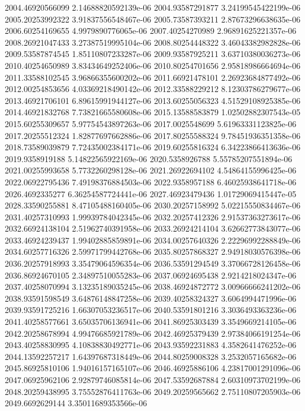 {2004.46920566099 2.14688820592139e-06
2004.93587291877 3.24199545422199e-06
2005.20253992322 3.91837556548467e-06
2005.73587393211 2.87673296638635e-06
2006.60254169655 4.9979890776065e-06
2007.40254270989 2.96891625221357e-06
2008.26921047433 3.27387519995104e-06
2008.80254448322 3.46043382982828e-06
2009.53587874545 1.85110807233287e-06
2009.93587925211 3.63710380036273e-06
2010.40254650989 3.83434649252406e-06
2010.80254701656 2.95818986664694e-06
2011.33588102545 3.96866355600202e-06
2011.66921478101 2.26923684877492e-06
2012.00254853656 4.03369218490142e-06
2012.33588229212 8.12303786279677e-06
2013.46921706101 6.89615991944127e-06
2013.60255056323 4.51529108925385e-06
2014.46921832768 7.73821665580608e-06
2015.13588583879 1.02502882307543e-05
2015.60255309657 5.97754543897263e-06
2017.0025548699 5.61963331123825e-06
2017.20255512324 1.82877697662886e-06
2017.80255588324 9.78451936351358e-06
2018.73589039879 7.72435002384171e-06
2019.60255816324 6.34223866413636e-06
2019.9358919188 5.14822565922169e-06
2020.5358926788 5.55785207551894e-06
2021.00255993658 5.7732260298128e-06
2021.26922694102 4.54864155996425e-06
2022.06922795436 7.49198376884503e-06
2022.9358957188 6.46025938641718e-06
2026.4692335277 6.36254587724441e-06
2027.46923479436 1.01729069415447e-05
2028.33590255881 8.47105488160405e-06
2030.20257158992 5.02215550834467e-06
2031.40257310993 1.99939784042345e-06
2032.20257412326 2.91537363273617e-06
2032.66924138104 2.51962740391958e-06
2033.26924214104 3.62662773843077e-06
2033.46924239437 1.99402885859891e-06
2034.00257640326 2.22296992288849e-06
2034.60257716326 2.59971799442768e-06
2035.80257868327 2.94918030576398e-06
2036.20257918993 3.35479064596354e-06
2036.53591294549 3.37066728126458e-06
2036.86924670105 2.34897510055283e-06
2037.06924695438 2.9214218024347e-06
2037.40258070994 3.13235189035245e-06
2038.46924872772 3.00966666241202e-06
2038.93591598549 3.64876148847258e-06
2039.40258324327 3.6064994471996e-06
2039.93591725216 1.66307053236517e-06
2040.53591801216 3.3036493363236e-06
2041.40258577661 3.65035706136941e-06
2041.86925303439 3.3549669214105e-06
2042.20258678994 4.99476685921789e-06
2042.46925379439 2.97384066191254e-06
2043.40258830995 4.10838830492771e-06
2043.93592231883 4.3582641476252e-06
2044.13592257217 1.64397687318449e-06
2044.80259008328 3.2532057165682e-06
2045.86925810106 1.94016157165107e-06
2046.46925886106 4.23817001291096e-06
2047.06925962106 2.92879746085814e-06
2047.53592687884 2.60310973702199e-06
2048.20259438995 3.75552876411763e-06
2049.20259565662 2.75110807205903e-06
2049.6692629144 3.35011689353566e-06
}
